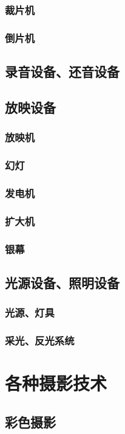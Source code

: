 \documentclass[UTF8]{../../ApplicationUniverse}
\begin{document}
        \subsubsection{裁片机}
        \subsubsection{倒片机}
    \subsection{录音设备、还音设备}
    \subsection{放映设备}
        \subsubsection{放映机}
        \subsubsection{幻灯}
        \subsubsection{发电机}
        \subsubsection{扩大机}
        \subsubsection{银幕}
    \subsection{光源设备、照明设备}
        \subsubsection{光源、灯具}
        \subsubsection{采光、反光系统}
\section{各种摄影技术}
    \subsection{彩色摄影}
\end{document}
